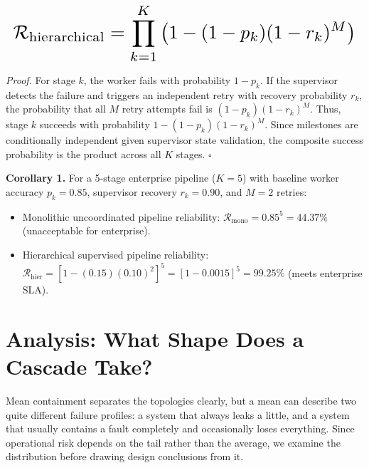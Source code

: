\documentclass{article}
\begin{document}
\begin{equation}
\resizebox{\columnwidth}{!}{$\displaystyle
\begin{aligned}
\mathcal{R}_{\text{hierarchical}} = \prod_{k=1}^K \left( 1 - (1 - p_k)(1 - r_k)^M \right)
\end{aligned}
$}
\end{equation}


























\textit{Proof.} For stage $k$, the worker fails with probability $1 - p_k$. If the supervisor detects the failure and triggers an independent retry with recovery probability $r_k$, the probability that all $M$ retry attempts fail is $(1 - p_k)(1 - r_k)^M$. Thus, stage $k$ succeeds with probability $1 - (1 - p_k)(1 - r_k)^M$. Since milestones are conditionally independent given supervisor state validation, the composite success probability is the product across all $K$ stages. $\square$

\textbf{Corollary 1.} For a 5-stage enterprise pipeline ($K = 5$) with baseline worker accuracy $p_k = 0.85$, supervisor recovery $r_k = 0.90$, and $M = 2$ retries:
\begin{itemize}
  \item Monolithic uncoordinated pipeline reliability: $\mathcal{R}_{\text{mono}} = 0.85^5 = 44.37\%$ (unacceptable for enterprise).
  \item Hierarchical supervised pipeline reliability: $\mathcal{R}_{\text{hier}} = [1 - (0.15)(0.10)^2]^5 = [1 - 0.0015]^5 = 99.25\%$ (meets enterprise SLA).
\end{itemize}




\section{Analysis: What Shape Does a Cascade Take?}


Mean containment separates the topologies clearly, but a mean can describe two
quite different failure profiles: a system that always leaks a little, and a system
that usually contains a fault completely and occasionally loses everything. Since
operational risk depends on the tail rather than the average, we examine the
distribution before drawing design conclusions from it.
\end{document}
